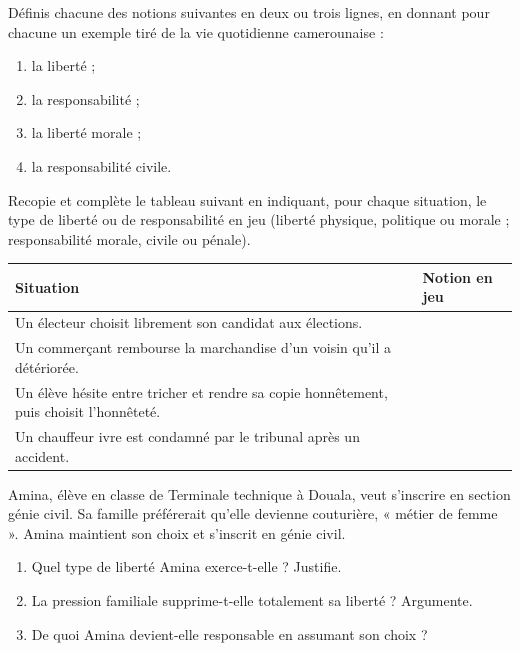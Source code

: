 \documentclass[11pt]{article}
\newcounter{popsec}
\newcounter{popsub}
\newcommand{\courssub}[1]{%
  \stepcounter{popsub}%
  \par\vspace{9pt}\noindent{\popxbold\fontsize{11.5}{13}\selectfont\color{popink}{\color{poporange}\thepopsec.\thepopsub}\hspace{6pt}#1}\par\nopagebreak\vspace{4pt}
}
\begin{document}
\begin{exercice}[Définitions]
Définis chacune des notions suivantes en deux ou trois lignes, en donnant pour chacune un exemple tiré de la vie quotidienne camerounaise :
\begin{enumerate}
\item la liberté ;
\item la responsabilité ;
\item la liberté morale ;
\item la responsabilité civile.
\end{enumerate}
\end{exercice}

\begin{exercice}
Recopie et complète le tableau suivant en indiquant, pour chaque situation, le type de liberté ou de responsabilité en jeu (liberté physique, politique ou morale ; responsabilité morale, civile ou pénale).
\begin{center}
\begin{tabularx}{\linewidth}{|X|l|}
\hline
\rowcolor{popblueL} \textbf{Situation} & \textbf{Notion en jeu} \\
\hline
Un électeur choisit librement son candidat aux élections. & \\
\hline
Un commerçant rembourse la marchandise d'un voisin qu'il a détériorée. & \\
\hline
Un élève hésite entre tricher et rendre sa copie honnêtement, puis choisit l'honnêteté. & \\
\hline
Un chauffeur ivre est condamné par le tribunal après un accident. & \\
\hline
\end{tabularx}
\end{center}
\end{exercice}

\courssub{Je m'entraîne}

\begin{exercice}
Amina, élève en classe de Terminale technique à Douala, veut s'inscrire en section génie civil. Sa famille préférerait qu'elle devienne couturière, « métier de femme ». Amina maintient son choix et s'inscrit en génie civil.
\begin{enumerate}
\item Quel type de liberté Amina exerce-t-elle ? Justifie.
\item La pression familiale supprime-t-elle totalement sa liberté ? Argumente.
\item De quoi Amina devient-elle responsable en assumant son choix ?
\end{enumerate}
\end{exercice}
\end{document}
